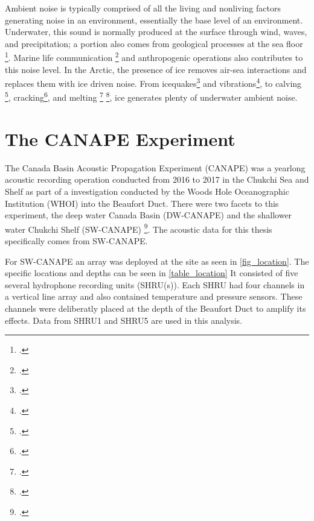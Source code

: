 Ambient noise is typically comprised of all the living and nonliving factors generating noise in an environment, essentially the base level of an environment. Underwater, this sound is normally produced at the surface through wind, waves, and precipitation; a portion also comes from geological processes at the sea floor \footcite[]{dziak2015sources}. Marine life communication \footcite[]{ladegaard2021} and anthropogenic operations also contributes to this noise level. In the Arctic, the presence of ice removes air-sea interactions and replaces them with ice driven noise. From icequakes\footcite[]{muller2005singing} and vibrations\footcite[]{kinda2015arctic}, to calving \footcite[]{matsumoto2014antarctic}, cracking\footcite[]{milne1964ambient}, and melting     \footcite[]{glowacki2018intensity} \footcite[]{mahanty2020melt}, ice generates plenty of underwater ambient noise. 

\section{The CANAPE Experiment} \label{intro_canape}

The Canada Basin Acoustic Propagation Experiment (CANAPE) was a yearlong acoustic recording operation conducted from 2016 to 2017 in the Chukchi Sea and Shelf as part of a investigation conducted by the Woods Hole Oceanographic Institution (WHOI) into the Beaufort Duct. There were two facets to this experiment, the deep water Canada Basin (DW-CANAPE) and the shallower water Chukchi Shelf (SW-CANAPE) \footcite[]{ballard2020yearlong}. The acoustic data for this thesis specifically comes from SW-CANAPE.

For SW-CANAPE an array was deployed at the site as seen in \autoref{fig_location}. The specific locations and depths can be seen in \autoref{table_location} It consisted of five several hydrophone recording units (SHRU(s)). Each SHRU had four channels in a vertical line array and also contained temperature and pressure sensors. These channels were deliberatly placed at the depth of the Beaufort Duct to amplify its effects. Data from SHRU1 and SHRU5 are used in this analysis.

